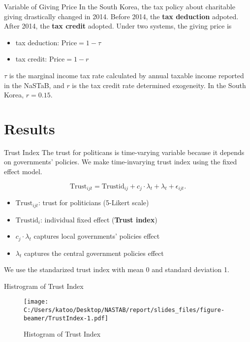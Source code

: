 \documentclass[
  ignorenonframetext,
]{beamer}
\providecommand{\tightlist}{%
  \setlength{\itemsep}{0pt}\setlength{\parskip}{0pt}}
\begin{document}
\begin{frame}{Variable of Giving Price}
\protect\hypertarget{variable-of-giving-price}{}
In the South Korea, the tax policy about charitable giving drastically
changed in 2014. Before 2014, the \textbf{tax deduction} adpoted. After
2014, the \textbf{tax credit} adopted. Under two systems, the giving
price is

\begin{itemize}
\tightlist
\item
  tax deduction: \(\text{Price} = 1 - \tau\)
\item
  tax credit: \(\text{Price} = 1 - r\)
\end{itemize}

\(\tau\) is the marginal income tax rate calculated by annual taxable
income reported in the NaSTaB, and \(r\) is the tax credit rate
determined exogeneity. In the South Korea, \(r = 0.15\).
\end{frame}

\hypertarget{results}{%
\section{Results}\label{results}}

\begin{frame}{Trust Index}
\protect\hypertarget{trust-index}{}
The trust for politicans is time-varying variable because it depends on
governments' policies. We make time-invarying trust index using the
fixed effect model.

\[
    \text{Trust}_{ijt} = \text{Trustid}_{ij} + c_j \cdot \lambda_t + \lambda_t + \epsilon_{ijt}.
\]

\begin{itemize}
\tightlist
\item
  \(\text{Trust}_{ijt}\): trust for politicians (5-Likert scale)
\item
  \(\text{Trustid}_i\): individual fixed effect (\textbf{Trust index})
\item
  \(c_j \cdot \lambda_t\) captures local governments' policies effect
\item
  \(\lambda_t\) captures the central government policies effect
\end{itemize}

We use the standarized trust index with mean 0 and standard deviation 1.
\end{frame}

\begin{frame}{Histrogram of Trust Index}
\protect\hypertarget{histrogram-of-trust-index}{}
\begin{figure}
\centering
\texttt{[image: C:/Users/katoo/Desktop/NASTAB/report/slides\_files/figure-beamer/TrustIndex-1.pdf]}
\caption{Histogram of Trust Index}
\end{figure}
\end{frame}
\end{document}
